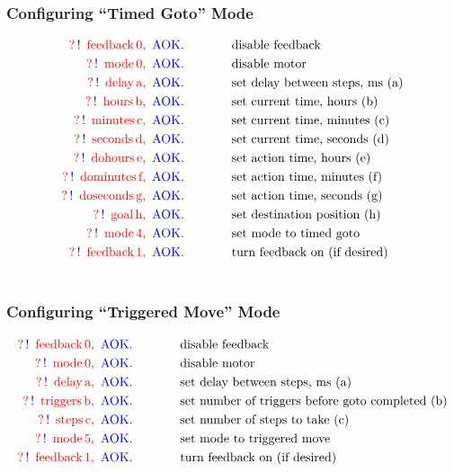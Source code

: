 \documentclass[10pt]{article}
\newcommand{\comm}[3]{
\nonumber \textcolor{red}{?} \, \textcolor{blue}{!} \, \textcolor{red}{\text{ #1}} \,\textcolor{red}{\text{#2, }} \, \textcolor{blue}{\text{AOK.}} \, & \text{\hspace{0.5in}#3}}
\begin{document}
\subsubsection{Configuring ``Timed Goto'' Mode}
\begin{align}
\comm{feedback}{0}{disable feedback} \\
\comm{mode}{0}{disable motor} \\
\comm{delay}{a}{set delay between steps, ms (a)} \\
\comm{hours}{b}{set current time, hours (b)} \\
\comm{minutes}{c}{set current time, minutes (c)} \\
\comm{seconds}{d}{set current time, seconds (d)} \\
\comm{dohours}{e}{set action time, hours (e)} \\
\comm{dominutes}{f}{set action time, minutes (f)} \\
\comm{doseconds}{g}{set action time, seconds (g)} \\
\comm{goal}{h}{set destination position (h)} \\
\comm{mode}{4}{set mode to timed goto} \\
\comm{feedback}{1}{turn feedback on (if desired)} \\
\nonumber
\end{align}

\subsubsection{Configuring ``Triggered Move'' Mode}
\begin{align}
\comm{feedback}{0}{disable feedback} \\
\comm{mode}{0}{disable motor} \\
\comm{delay}{a}{set delay between steps, ms (a)} \\
\comm{triggers}{b}{set number of triggers before goto completed (b)} \\
\comm{steps}{c}{set number of steps to take (c)} \\
\comm{mode}{5}{set mode to triggered move} \\
\comm{feedback}{1}{turn feedback on (if desired)} \\
\nonumber
\end{align}
\end{document}
